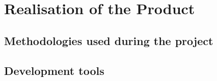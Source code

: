 \section{Realisation of the Product}
\label{sec:realisation}

\subsection{Methodologies used during the project}
\label{ssec:methodologies}

\subsection{Development tools}
\label{ssec:tools}

